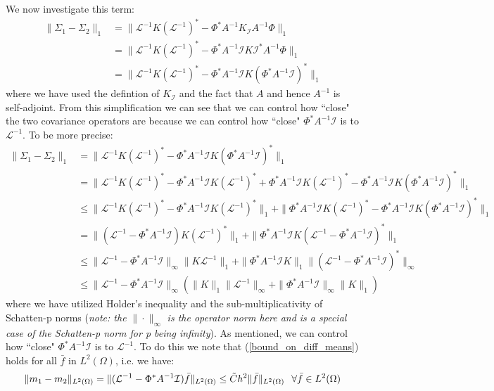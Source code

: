 We now investigate this term:
\begin{align*}
    \|\Sigma_{1}-\Sigma_2\|_{1}&=\|\mathcal{L}^{-1}K(\mathcal{L}^{-1})^{*}-\Phi^{*}A^{-1}K_{\mathcal{I}}A^{-1}\Phi\|_{1} \\
    &=\|\mathcal{L}^{-1}K(\mathcal{L}^{-1})^{*}-\Phi^{*}A^{-1}\mathcal{I}K\mathcal{I}^{*}A^{-1}\Phi\|_{1} \\
    &=\|\mathcal{L}^{-1}K(\mathcal{L}^{-1})^{*}-\Phi^{*}A^{-1}\mathcal{I}K(\Phi^{*}A^{-1}\mathcal{I})^{*}\|_{1}
\end{align*}
where we have used the defintion of $K_{\mathcal{I}}$ and the fact that $A$ and hence $A^{-1}$ is self-adjoint. From this simplification we can see that we can control how ``close" the two covariance operators are because we can control how ``close" $\Phi^{*}A^{-1}\mathcal{I}$ is to $\mathcal{L}^{-1}$. To be more precise:
\begin{align*}
    \|\Sigma_{1}-\Sigma_{2}\|_{1}&=\|\mathcal{L}^{-1}K(\mathcal{L}^{-1})^{*}-\Phi^{*}A^{-1}\mathcal{I}K(\Phi^{*}A^{-1}\mathcal{I})^{*}\|_{1} \\
    &=\|\mathcal{L}^{-1}K(\mathcal{L}^{-1})^{*}-\Phi^{*}A^{-1}\mathcal{I}K(\mathcal{L}^{-1})^{*}+\Phi^{*}A^{-1}\mathcal{I}K(\mathcal{L}^{-1})^{*}-\Phi^{*}A^{-1}\mathcal{I}K(\Phi^{*}A^{-1}\mathcal{I})^{*}\|_{1} \\
    &\leq\|\mathcal{L}^{-1}K(\mathcal{L}^{-1})^{*}-\Phi^{*}A^{-1}\mathcal{I}K(\mathcal{L}^{-1})^{*}\|_{1} + \|\Phi^{*}A^{-1}\mathcal{I}K(\mathcal{L}^{-1})^{*}-\Phi^{*}A^{-1}\mathcal{I}K(\Phi^{*}A^{-1}\mathcal{I})^{*}\|_{1} \\
    &= \|(\mathcal{L}^{-1}-\Phi^{*}A^{-1}\mathcal{I})K(\mathcal{L}^{-1})^{*}\|_{1} + \|\Phi^{*}A^{-1}\mathcal{I}K(\mathcal{L}^{-1}-\Phi^{*}A^{-1}\mathcal{I})^{*}\|_{1} \\
    &\leq\|\mathcal{L}^{-1}-\Phi^{*}A^{-1}\mathcal{I}\|_{\infty}\|K\mathcal{L}^{-1}\|_{1}+\|\Phi^{*}A^{-1}\mathcal{I}K\|_{1}\|(\mathcal{L}^{-1}-\Phi^{*}A^{-1}\mathcal{I})^{*}\|_{\infty} \\
    &\leq\|\mathcal{L}^{-1}-\Phi^{*}A^{-1}\mathcal{I}\|_{\infty}(\|K\|_{1}\|\mathcal{L}^{-1}\|_{\infty}+\|\Phi^{*}A^{-1}\mathcal{I}\|_{\infty}\|K\|_{1})
\end{align*}
where we have utilized Holder's inequality and the sub-multiplicativity of Schatten-p norms (\textit{note: the} $\|\cdot\|_{\infty}$ \textit{is the operator norm here and is a special case of the Schatten-p norm for p being infinity}). As mentioned, we can control how ``close" $\Phi^{*}A^{-1}\mathcal{I}$ is to $\mathcal{L}^{-1}$. To do this we note that (\ref{bound_on_diff_means}) holds for all $\bar{f}$ in $L^{2}(\Omega)$, i.e. we have:
\begin{equation*}
    \|m_1-m_2\|_{L^{2}(\Omega)}=\|(\mathcal{L}^{-1}-\Phi^{*}A^{-1}\mathcal{I})\bar{f}\|_{L^{2}(\Omega)}\leq \tilde{C}h^{2}\|\bar{f}\|_{L^2(\Omega)} \hspace{0.25cm} \forall\bar{f}\in L^{2}(\Omega)
\end{equation*}

